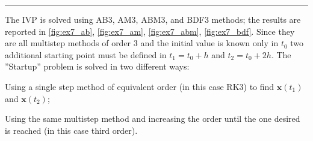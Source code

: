 \documentclass[11pt,a4paper,oneside]{article}
\renewcommand{\vec}[1]{\mathbf{#1}}
\begin{document}
\medskip \hrule \medskip

The IVP is solved using AB3, AM3, ABM3, and BDF3 methods; the results are reported in \cref{fig:ex7_ab}, \cref{fig:ex7_am}, \cref{fig:ex7_abm}, \cref{fig:ex7_bdf}.
Since they are all multistep methods of order 3 and the initial value is known only in $t_0$ two additional starting point must be defined in $t_1=t_0+h$ and $t_2=t_0+2h$.
The ''Startup'' problem is solved in two different ways:
\begin{enumerate*}[label=\arabic*)]
    \item Using a single step method of equivalent order (in this case RK3) to find $\vec{x}(t_1)$ and $\vec{x}(t_2)$;
    \item Using the same multistep method and increasing the order until the one desired is reached (in this case third order).
\end{enumerate*}
\end{document}
